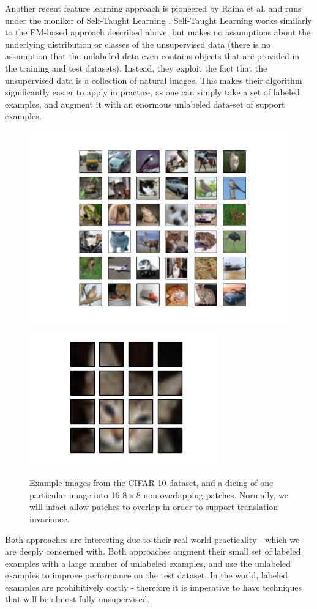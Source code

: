 \documentclass{article} %
\begin{document}
Another recent feature learning approach is pioneered by Raina et al. and runs under the
moniker of Self-Taught Learning \cite{raina}. Self-Taught Learning works similarly to
the EM-based
approach described above, but makes no assumptions about the underlying distribution or
classes of the unsupervised data (there is no assumption that the unlabeled data even
contains objects that are provided in the training and test datasets). Instead, they exploit
the fact that the unsupervised data is a collection of natural images. This makes their
algorithm significantly easier to apply in practice, as one can simply take a set of labeled
examples, and augment it with an enormous unlabeled data-set of support examples.

\begin{figure}
\includegraphics[width=0.5\columnwidth]{./images/examples.png}
\includegraphics[width=0.5\columnwidth]{./images/extracted_patches.png}
\caption{Example images from the CIFAR-10 dataset, and a dicing of one particular image into 16 $8 \times 8$ non-overlapping patches. Normally, we will infact allow patches to overlap in order to support translation invariance.}
\end{figure}

Both approaches are interesting due to their real world practicality - which we are deeply
concerned with. Both approaches augment their small set of labeled examples with a large
number of unlabeled examples, and use the unlabeled examples to improve performance on the
test dataset. In the world, labeled examples are prohibitively costly -
therefore it is imperative to have techniques that will be almost fully unsupervised.
\end{document}
